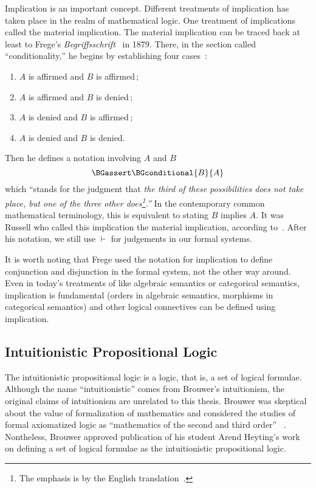 Implication is an important concept.
Different treatments of implication has taken place in the realm of
mathematical logic.
One treatment of implications called the material implication.
The material implication can be traced back at least to
Frege's \textit{Begriffsschrift}~\citep{frege} in 1879.  There, in the
section called
``conditionality,''
he begins by establishing four cases~\citep[p.~13]{frege}:
\begin{enumerate}
 \item $A$ is affirmed and $B$ is affirmed\,;
 \item $A$ is affirmed and $B$ is denied\,;
 \item $A$ is denied and $B$ is affirmed\,;
 \item $A$ is denied and $B$ is denied.
\end{enumerate}
Then he defines a notation involving $A$ and $B$
\[
\BGassert\BGconditional{B}{A}
\]
which ``stands for the
judgment that \textit{the third of these possibilities does not take
place, but one of the three other does\footnote{The emphasis is by
the English translation~\citep[p.~14]{frege}.}.''}
In the contemporary common mathematical terminology, this is equivalent
to stating $B$ implies $A$.
It was Russell who called this implication the material implication,
according to~\citet{sep-conditionals}.
After his notation, we still use $\vdash$ for judgements in our formal systems.

It is worth noting that Frege used the notation for implication to define conjunction and
disjunction in the formal system, not the other way around.  Even in
today's treatments of
like algebraic semantics or categorical semantics, implication is
fundamental (orders in algebraic semantics, morphisms in categorical
semantics) and other logical connectives
can be defined using implication.

\subsection{Intuitionistic Propositional Logic}

The intuitionistic propositional logic is a logic, that is, a set of
logical formulae.
Although the name ``intuitionistic'' comes from Brouwer's intuitionism,
the original claims of intuitionism are unrelated to this thesis.
Brouwer was skeptical about the value of formalization of
mathematics and considered the studies of formal axiomatized logic as
``mathematics of the second and third order''
~.
Nontheless, Brouwer approved publication of his student Arend Heyting's
work on defining a set of logical formulae as the intuitionistic
propositional logic.


